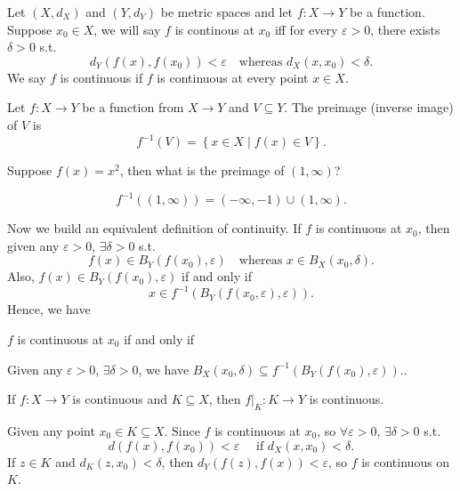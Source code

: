 \begin{definition} \label{def: continuous}
    Let \((X, d_X)\) and \((Y, d_Y)\) be metric spaces and let \(f: X \to Y\) be a function. Suppose \(x_0 \in X\), we will say \(f\) is continous at \(x_0\) iff for every \(\varepsilon > 0\), there exists \(\delta > 0\) s.t. 
    \[
        d_Y(f(x), f(x_0)) < \varepsilon \quad \text{whereas } d_X(x, x_0) < \delta.
    \] We say \(f\) is continuous if \(f\) is continuous at every point \(x \in X\).     
\end{definition}

\begin{definition}[Preimage] \label{def: preimage}
    Let \(f : X \to Y\) be a function from \(X \to Y\) and \(V \subseteq Y\). The preimage (inverse image) of \(V\) is 
    \[
        f^{-1}(V) = \left\{ x\in X \mid f(x) \in V \right\}.
    \]    
\end{definition}

\begin{eg}
    Suppose \(f(x) = x^2\), then what is the preimage of \((1, \infty )\)?  
\end{eg}
\begin{explanation}
    \[
        f^{-1}((1, \infty )) = (-\infty , -1) \cup (1, \infty ).
    \]
\end{explanation}
Now we build an equivalent definition of continuity. If \(f\) is continuous at \(x_0\), then given any \(\varepsilon > 0\), \(\exists \delta > 0\) s.t. 
\[
    f(x) \in B_Y(f(x_0), \varepsilon ) \quad \text{whereas } x \in B_X(x_0, \delta ).
\]  Also, \(f(x) \in B_Y(f(x_0), \varepsilon )\) if and only if
\[
    x \in f^{-1}(B_Y(f(x_0, \varepsilon ), \varepsilon )).
\] Hence, we have 
\begin{corollary}
    \(f\) is continuous at \(x_0\) if and only if 
    \begin{center}
        Given any \(\varepsilon > 0\), \(\exists \delta > 0\), we have \(B_X(x_0, \delta ) \subseteq f^{-1}(B_Y(f(x_0), \varepsilon )).\).   
    \end{center}  
\end{corollary}

\begin{remark} \label{rmk: if f conti then f intersect K conti}
    If \(f: X \to Y\) is continuous and \(K \subseteq X\), then \(f\vert_K : K \to Y\) is continuous.   
\end{remark}
\begin{explanation}
    Given any point \(x_0 \in K \subseteq X\). Since \(f\) is continuous at \(x_0\), so \(\forall \varepsilon > 0\), \(\exists \delta > 0\) s.t. 
    \[
        d\left( f(x), f(x_0) \right) < \varepsilon \quad \text{ if } d_X(x, x_0) < \delta. 
    \]     
    If \(z \in K\) and \(d_K(z, x_0) < \delta \), then \(d_Y(f(z), f(x)) <\varepsilon \), so \(f\) is continuous on \(K\).     
\end{explanation}

